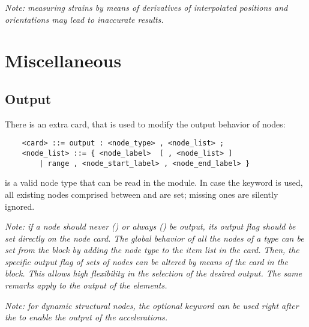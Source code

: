 \emph{Note: measuring strains by means of derivatives of interpolated
positions and orientations may lead to inaccurate results.}





\section{Miscellaneous}

\subsection{Output}\label{sec:NODE:MISC:OUTPUT}
There is an extra card, that is used to modify the output behavior of nodes:  
\begin{verbatim}
    <card> ::= output : <node_type> , <node_list> ;
    <node_list> ::= { <node_label>  [ , <node_list> ] 
        | range , <node_start_label> , <node_end_label> }
\end{verbatim}
 is a valid node type that can be read in the 
module.
In case the keyword  is used, all existing nodes comprised
between  and 
are set; missing ones are silently ignored.

\noindent
{\em
   Note: if a node should never () or always () be output,
   its output flag should be set directly on the node card. 
   The global behavior of all the nodes of a type can be set from the 
    block by adding the node type to the item list in the 
    card. 
   Then, the specific output flag of sets of nodes can be altered by means 
   of the  card in the  block. 
   This allows high flexibility in the selection of the desired output. 
   The same remarks apply to the output of the elements.
}

{\em
    Note: for dynamic structural nodes, the optional keyword 
    can be used right after the  to enable the output
    of the accelerations.
}

